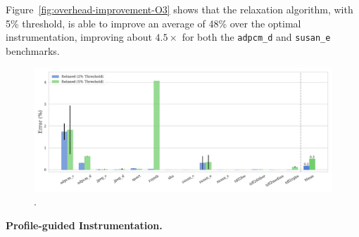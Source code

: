 Figure~\ref{fig:overhead-improvement-O3} shows that the relaxation algorithm, with 5\% threshold, is able to improve an average of 48\% over the optimal instrumentation, improving about $4.5\times$ for both the \texttt{adpcm\_d} and \texttt{susan\_e} benchmarks.

\begin{figure}[h!]
    \centering
    \includegraphics[width=\textwidth]{figs/error-O3.pdf}
    \caption{.}
    \label{fig:instr-all-thresholds}
\end{figure}

\textbf{Profile-guided Instrumentation.}

%




